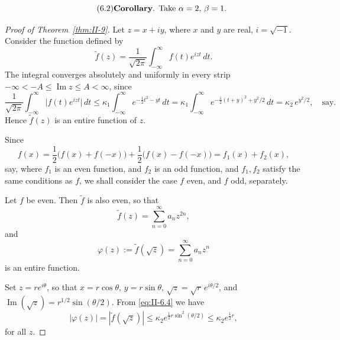 \begin{equation*}\tag{6.2}\label{eq:II-6.2}
\text{\textbf{Corollary}. Take $\alpha=2$, $\beta=1$.}
\end{equation*}

\begin{proof}[Proof of Theorem~\ref{thm:II-9}]
Let $z=x+iy$, where $x$ and $y$ are real, $i=\sqrt{-1}$. Consider the function defined by
\begin{equation}\tag{6.3}\label{eq:II-6.3}
\tilde f(z)=\frac{1}{\sqrt{2\pi}}\int_{-\infty}^{\infty}f(t)e^{izt}\,dt.
\end{equation}
The integral converges absolutely and uniformly in every strip $-\infty<-A\le\operatorname{Im}z\le A<\infty$, since
\[
\frac{1}{\sqrt{2\pi}}\int_{-\infty}^{\infty}\bigl|f(t)e^{izt}\bigr|\,dt
\le\kappa_{1}\int_{-\infty}^{\infty}e^{-\frac{1}{2}t^{2}-yt}\,dt
=\kappa_{1}\int_{-\infty}^{\infty}e^{-\frac{1}{2}(t+y)^{2}+y^{2}/2}\,dt
=\kappa_{2}\,e^{y^{2}/2},\quad\text{say}.
\]
Hence $\tilde f(z)$ is an entire function of $z$.

Since
\[
f(x)=\frac{1}{2}\bigl(f(x)+f(-x)\bigr)+\frac{1}{2}\bigl(f(x)-f(-x)\bigr)
=f_{1}(x)+f_{2}(x),
\]
say, where $f_{1}$ is an even function, and $f_{2}$ is an odd function, and $f_{1},f_{2}$ satisfy the same conditions as $f$, we shall consider the case $f$ even, and $f$ odd, separately.

Let $f$ be even. Then $\tilde f$ is also even, so that
\[
\tilde f(z)=\sum_{n=0}^{\infty}a_{n}z^{2n},
\]
and
\begin{equation}\tag{6.4}\label{eq:II-6.4}
\varphi(z):=\tilde f(\sqrt{z})=\sum_{n=0}^{\infty}a_{n}z^{n}
\end{equation}
is an entire function.

Set $z=r e^{i\theta}$, so that $x=r\cos\theta$, $y=r\sin\theta$, $\sqrt{z}=\sqrt{r}\,e^{i\theta/2}$, and $\operatorname{Im}(\sqrt{z})=r^{1/2}\sin(\theta/2)$. From \eqref{eq:II-6.4} we have
\begin{equation}\tag{6.5}\label{eq:II-6.5}
|\varphi(z)|=|\tilde f(\sqrt{z})|\le\kappa_{2}e^{\frac{1}{2}r\sin^{2}(\theta/2)}
\le\kappa_{2}e^{\frac{1}{2}r},
\end{equation}
for all $z$.


\end{proof}
